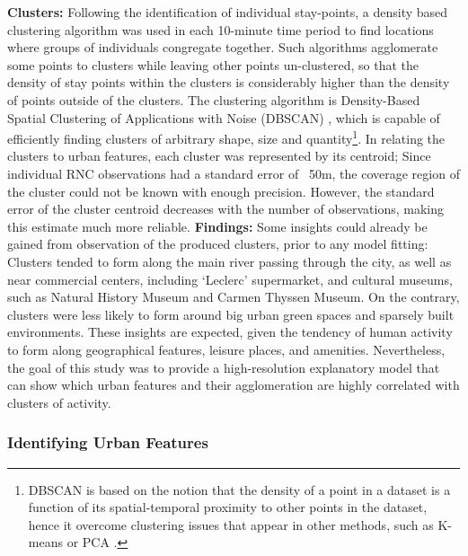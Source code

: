 {    \textbf{Clusters:} Following the identification of individual stay-points, a density based clustering algorithm was used in each 10-minute time period to find locations where groups of individuals congregate together. Such algorithms agglomerate some points to clusters while leaving other points un-clustered, so that the density of stay points within the clusters is considerably higher than the density of points outside of the clusters. The clustering algorithm is Density-Based Spatial Clustering of Applications with Noise (DBSCAN) \cite{ester1996density}, which is capable of efficiently finding clusters of arbitrary shape, size and quantity\footnote{DBSCAN is based on the notion that the density of a point in a dataset is a function of its spatial-temporal proximity to other points in the dataset, hence it overcome clustering issues that appear in other methods, such as K-means or PCA \cite{ester1996density}.}. In relating the clusters to urban features, each cluster was represented by its centroid; Since individual RNC observations had a standard error of ~50m, the coverage region of the cluster could not be known with enough precision. However, the standard error of the cluster centroid decreases with the number of observations, making this estimate much more reliable.
    \newline
    \textbf{Findings:} Some insights could already be gained from observation of the produced clusters, prior to any model fitting: Clusters tended to form along the main river passing through the city, as well as near commercial centers, including `Leclerc' supermarket, and cultural museums, such as Natural History Museum and Carmen Thyssen Museum. On the contrary, clusters were less likely to form around big urban green spaces and sparsely built environments. These insights are expected, given the tendency of human activity to form along geographical features, leisure places, and amenities. Nevertheless, the goal of this study was to provide a high-resolution explanatory model that can show which urban features and their agglomeration are highly correlated with clusters of activity.
}

\subsubsection{Identifying Urban Features} \label{subsec:urbFeat}

